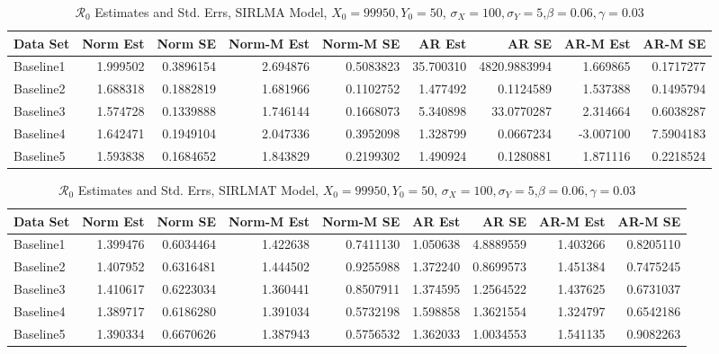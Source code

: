 \documentclass[12pt]{article}
\newcommand{\rr}{\ensuremath{\mathcal{R}_0}}
\begin{document}
\begin{table}[H]
	
	\caption{\label{tab:}$\rr$ Estimates and Std. Errs, SIRLMA Model,
		$X_0 = 99950, Y_0 = 50$, $\sigma_X = 100, \sigma_Y = 5$,$\beta = 0.06, \gamma = 0.03$}
	\centering
	\begin{footnotesize}
	\begin{tabular}[t]{l|r|r|r|r|r|r|r|r}
		\hline
		Data Set & Norm Est & Norm SE & Norm-M Est & Norm-M SE & AR Est & AR SE & AR-M Est & AR-M SE\\
		\hline
		Baseline1 & 1.999502 & 0.3896154 & 2.694876 & 0.5083823 & 35.700310 & 4820.9883994 & 1.669865 & 0.1717277\\
		\hline
		Baseline2 & 1.688318 & 0.1882819 & 1.681966 & 0.1102752 & 1.477492 & 0.1124589 & 1.537388 & 0.1495794\\
		\hline
		Baseline3 & 1.574728 & 0.1339888 & 1.746144 & 0.1668073 & 5.340898 & 33.0770287 & 2.314664 & 0.6038287\\
		\hline
		Baseline4 & 1.642471 & 0.1949104 & 2.047336 & 0.3952098 & 1.328799 & 0.0667234 & -3.007100 & 7.5904183\\
		\hline
		Baseline5 & 1.593838 & 0.1684652 & 1.843829 & 0.2199302 & 1.490924 & 0.1280881 & 1.871116 & 0.2218524\\
		\hline
	\end{tabular}
\end{footnotesize}
\end{table}
\begin{table}[H]
	
	\caption{\label{tab:}$\rr$ Estimates and Std. Errs, SIRLMAT Model,
		$X_0 = 99950, Y_0 = 50$, $\sigma_X = 100, \sigma_Y = 5$,$\beta = 0.06, \gamma = 0.03$}
	\centering
	\begin{footnotesize}
	\begin{tabular}[t]{l|r|r|r|r|r|r|r|r}
		\hline
		Data Set & Norm Est & Norm SE & Norm-M Est & Norm-M SE & AR Est & AR SE & AR-M Est & AR-M SE\\
		\hline
		Baseline1 & 1.399476 & 0.6034464 & 1.422638 & 0.7411130 & 1.050638 & 4.8889559 & 1.403266 & 0.8205110\\
		\hline
		Baseline2 & 1.407952 & 0.6316481 & 1.444502 & 0.9255988 & 1.372240 & 0.8699573 & 1.451384 & 0.7475245\\
		\hline
		Baseline3 & 1.410617 & 0.6223034 & 1.360441 & 0.8507911 & 1.374595 & 1.2564522 & 1.437625 & 0.6731037\\
		\hline
		Baseline4 & 1.389717 & 0.6186280 & 1.391034 & 0.5732198 & 1.598858 & 1.3621554 & 1.324797 & 0.6542186\\
		\hline
		Baseline5 & 1.390334 & 0.6670626 & 1.387943 & 0.5756532 & 1.362033 & 1.0034553 & 1.541135 & 0.9082263\\
		\hline
	\end{tabular}
\end{footnotesize}
\end{table}
\end{document}
